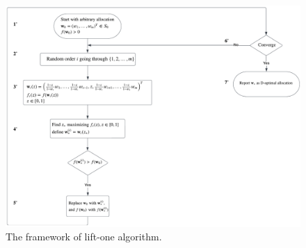\begin{figure}[htb!]
  \centering
  \includegraphics[width=\textwidth]{figures/unconstrained_lift_one.png}
  \caption{The framework of lift-one algorithm.}
  \label{fig:liftone_algo}
\end{figure}

